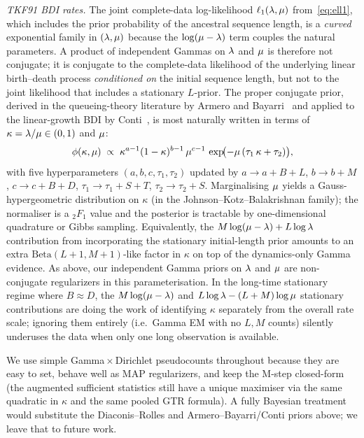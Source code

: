 \emph{TKF91 BDI rates.}  The joint complete-data log-likelihood
$\ell_1(\lambda,\mu)$ from~\eqref{eq:ell1}, which includes
the prior probability of the ancestral sequence length,
is a \emph{curved} exponential family in $(\lambda,\mu)$
because the $\log(\mu-\lambda)$ term couples the natural
parameters.  A product of independent Gammas on $\lambda$ and
$\mu$ is therefore not conjugate; it is conjugate to the
complete-data likelihood of the underlying linear birth--death process
\emph{conditioned on} the initial sequence length, but not to the
joint likelihood that includes a stationary $L$-prior.
The proper conjugate prior, derived in the queueing-theory literature
by Armero and Bayarri~\cite{ArmeroBayarri1994} and applied to the
linear-growth BDI by Conti~\cite{Conti2003}, is most naturally written
in terms of $\kappa = \lambda/\mu \in (0,1)$ and $\mu$:
\[
\phi(\kappa,\mu)
\;\propto\;
\kappa^{a-1}(1-\kappa)^{b-1}\,\mu^{c-1}\,
\exp\!\bigl(-\mu\,(\tau_1\,\kappa + \tau_2)\bigr),
\]
with five hyperparameters $(a,b,c,\tau_1,\tau_2)$ updated by
$a \to a + B + L$, $b \to b + M$, $c \to c + B + D$,
$\tau_1 \to \tau_1 + S + T$, $\tau_2 \to \tau_2 + S$.
Marginalising $\mu$ yields a Gauss-hypergeometric distribution
on $\kappa$ (in the Johnson--Kotz--Balakrishnan family); the
normaliser is a ${}_2F_1$ value and the posterior is tractable by
one-dimensional quadrature or Gibbs sampling.  Equivalently, the
$M\log(\mu-\lambda) + L\log\lambda$ contribution from
incorporating the stationary initial-length prior amounts to an extra
$\mathrm{Beta}(L+1,M+1)$-like factor in $\kappa$ on top of the
dynamics-only Gamma evidence.  As above, our independent Gamma priors
on $\lambda$ and $\mu$ are non-conjugate regularizers in this
parameterisation.  In the long-time stationary regime where
$B \approx D$, the $M\log(\mu-\lambda)$ and $L\log\lambda
- (L+M)\log\mu$ stationary contributions are doing the work of
identifying $\kappa$ separately from the overall rate scale; ignoring
them entirely (i.e.\ Gamma EM with no $L,M$ counts) silently underuses
the data when only one long observation is available.

We use simple Gamma${}\times{}$Dirichlet pseudocounts throughout
because they are easy to set, behave well as MAP regularizers, and
keep the M-step closed-form
(the augmented sufficient statistics still have a unique maximiser
via the same quadratic in $\kappa$ and the same pooled GTR formula).
A fully Bayesian treatment would substitute the Diaconis--Rolles and
Armero--Bayarri/Conti priors above; we leave that to future work.

